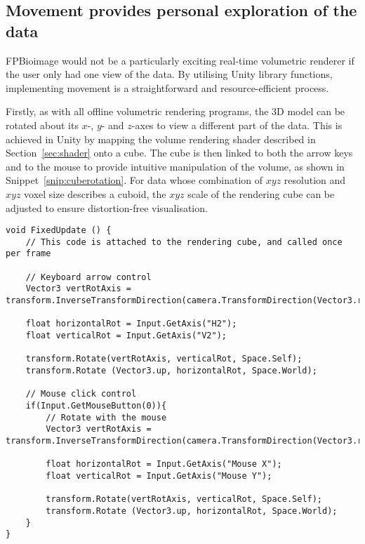 


\subsection{Movement provides personal exploration of the data}
FPBioimage would not be a particularly exciting real-time volumetric renderer if the user only had one view of the data.
By utilising Unity library functions, implementing movement is a straightforward and resource-efficient process.

Firstly, as with all offline volumetric rendering programs, the 3D model can be rotated about its $x$-, $y$- and $z$-axes to view a different part of the data.
This is achieved in Unity by mapping the volume rendering shader described in Section~\ref{sec:shader} onto a cube.
The cube is then linked to both the arrow keys and to the mouse to provide intuitive manipulation of the volume, as shown in Snippet~\ref{snip:cuberotation}.
For data whose combination of $xyz$ resolution and $xyz$ voxel size describes a cuboid, the $xyz$ scale of the rendering cube can be adjusted to ensure distortion-free visualisation.

\begin{lstlisting}[language={[Sharp]c}, label={snip:cuberotation}, caption={C\# code using built-in Unity functions to rotate the rendered volumetric data.}]
void FixedUpdate () {
	// This code is attached to the rendering cube, and called once per frame

	// Keyboard arrow control
	Vector3 vertRotAxis = transform.InverseTransformDirection(camera.TransformDirection(Vector3.right)).normalized;

	float horizontalRot = Input.GetAxis("H2");
	float verticalRot = Input.GetAxis("V2");

	transform.Rotate(vertRotAxis, verticalRot, Space.Self);
	transform.Rotate (Vector3.up, horizontalRot, Space.World);

	// Mouse click control
	if(Input.GetMouseButton(0)){
		// Rotate with the mouse
		Vector3 vertRotAxis = transform.InverseTransformDirection(camera.TransformDirection(Vector3.right)).normalized;

		float horizontalRot = Input.GetAxis("Mouse X");
		float verticalRot = Input.GetAxis("Mouse Y");

		transform.Rotate(vertRotAxis, verticalRot, Space.Self);
		transform.Rotate (Vector3.up, horizontalRot, Space.World);
	}
}
\end{lstlisting}

